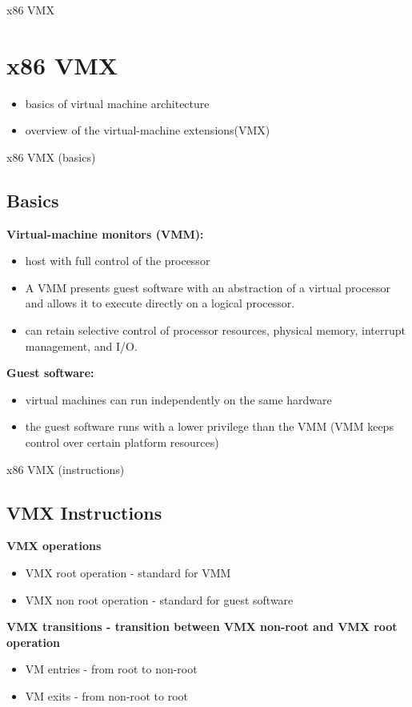\documentclass[11pt, aspectratio=169, modernfonts]{beamer}
\theoremstyle{definition}
\theoremstyle{remark}
\begin{document}
\begin{frame}{x86 VMX \cite{architecture64_sof_dev_manuel_vol_3}}
    \section{x86 VMX}
    \begin{itemize}
        \item basics of virtual machine architecture
        \item overview of the virtual-machine extensions(VMX)
    \end{itemize}
\end{frame}


\begin{frame}{x86 VMX (basics) \cite{architecture64_sof_dev_manuel_vol_3}}
    \subsection{Basics}
    \textbf{Virtual-machine monitors (VMM):}
    \begin{itemize}
            \item host with full control of the processor
            \item A VMM presents guest software with an abstraction of a virtual processor and allows it to execute directly on a logical processor. 
            \item can retain selective control of processor resources, physical memory, interrupt management, and I/O.
    \end{itemize}
    \textbf{Guest software:}
    \begin{itemize}
            \item virtual machines can run independently on the same hardware
            \item the guest software runs with a lower privilege than the VMM (VMM keeps control over certain platform resources)
    \end{itemize}
\end{frame}

\begin{frame}{x86 VMX (instructions)
\cite{architecture64_sof_dev_manuel_vol_3}}
    \subsection{VMX Instructions}
    \textbf{VMX operations}
    \begin{itemize}
        \item VMX root operation - standard for VMM
        \item VMX non root operation - standard for guest software
    \end{itemize}
    \textbf{VMX transitions - transition between VMX non-root and VMX root  operation}
    \begin{itemize}
        \item VM entries - from root to non-root
        \item VM exits - from non-root to root
    \end{itemize}
\end{frame}
\end{document}

